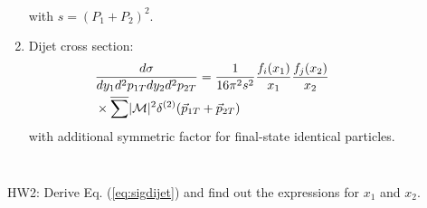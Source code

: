 \documentclass[9pt,a4paper,unknownkeysallowed,xcolor=dvipsnames,aspectratio=43]{beamer}
\begin{document}
\begin{frame}
\begin{columns}
\begin{enumerate}
\begin{align}
    \end{align}
    with $s=(P_1 + P_2)^2$.
    \item<2-> Dijet cross section:
    \begin{align}\label{eq:sigdijet}
        &\frac{d\sigma}{dy_1 d^2p_{1T} dy_2 d^2p_{2T}}=\frac{1}{16\pi^2 s^2}\frac{f_i(x_1)}{x_1}\frac{f_j(x_2)}{x_2}\notag\\
        &\times \overline{\sum} |\mathcal{M}|^2\delta^{(2)}(\vec{p}_{1T} + \vec{p}_{2T})
    \end{align}
    with additional symmetric factor for final-state identical particles. 
\end{enumerate}
\end{columns}
\begin{center}
    {\color{darkred} HW2: Derive Eq. (\ref{eq:sigdijet}) and find out the expressions for $x_1$ and $x_2$.}
\end{center}
\end{frame}
%
%
\end{document}
